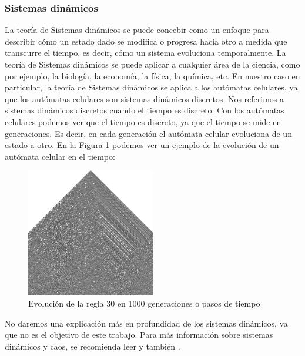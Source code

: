 \subsubsection{Sistemas din\'amicos}
\label{sec:SistemasDinamicos}
    La teor\'ia de Sistemas din\'amicos se puede concebir como un enfoque para describir c\'omo un estado dado se modifica o 
        progresa hacia otro a medida que transcurre el tiempo, es decir, c\'omo un sistema evoluciona temporalmente.
        La teor\'ia de Sistemas din\'amicos se puede aplicar a cualquier \'area de la ciencia, como por ejemplo,
        la biolog\'ia, la econom\'ia, la f\'isica, la qu\'imica, etc. En nuestro caso en particular, la teor\'ia de
        Sistemas din\'amicos se aplica a los aut\'omatas celulares, ya que los aut\'omatas celulares son sistemas
        din\'amicos discretos.
    \vskip 0.5cm
    Nos referimos a sistemas din\'amicos discretos cuando el tiempo es discreto. Con los aut\'omatas celulares
        podemos ver que el tiempo es discreto, ya que el tiempo se mide en generaciones. Es decir, en cada generaci\'on
        el aut\'omata celular evoluciona de un estado a otro. En la Figura \ref{fig:automataCelularEvolucion} podemos
        ver un ejemplo de la evoluci\'on de un aut\'omata celular en el tiempo:
        \begin{figure}[h]
            \centering
            \includegraphics[width=0.5\textwidth]{./images/marco_teorico/automatas_celulares/Regla30-1000Gen.png}
            \caption{Evoluci\'on de la regla 30 en 1000 generaciones o pasos de tiempo}
            \label{fig:automataCelularEvolucion}
        \end{figure}
    \vskip 0.5cm
    No daremos una explicaci\'on m\'as en profundidad de los sistemas din\'amicos, ya que no es el objetivo de este
        trabajo. Para m\'as informaci\'on sobre sistemas din\'amicos y caos, se recomienda leer \cite{Ott1993} y tambi\'en \cite{Luenberger1979}.
